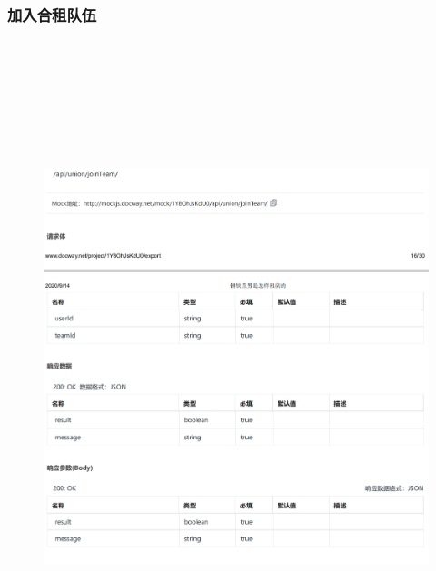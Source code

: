         \subsubsection{加入合租队伍}
        \begin{figure}[h]
            \centering
            \includegraphics[height=19.0cm,width=14.0cm]{design/image/api17.png} 
            \end{figure}  
            \newpage    
